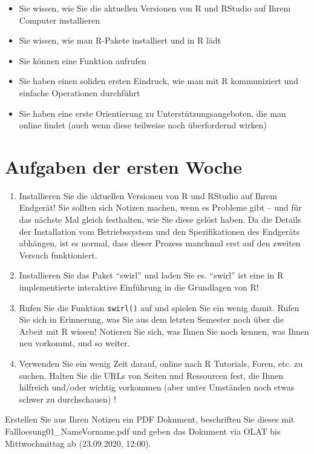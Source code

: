\documentclass[
]{book}
\providecommand{\tightlist}{%
  \setlength{\itemsep}{0pt}\setlength{\parskip}{0pt}}
\begin{document}
\begin{itemize}
\tightlist
\item
  Sie wissen, wie Sie die aktuellen Versionen von R und RStudio auf Ihrem Computer installieren
\item
  Sie wissen, wie man R-Pakete installiert und in R lädt
\item
  Sie können eine Funktion aufrufen
\item
  Sie haben einen soliden ersten Eindruck, wie man mit R kommuniziert und einfache Operationen durchführt
\item
  Sie haben eine erste Orientierung zu Unterstützungsangeboten, die man online findet (auch wenn diese teilweise noch überfordernd wirken)
\end{itemize}

\hypertarget{aufgaben-der-ersten-woche}{%
\section{Aufgaben der ersten Woche}\label{aufgaben-der-ersten-woche}}

\begin{enumerate}
\def\labelenumi{\arabic{enumi})}
\item
  Installieren Sie die aktuellen Versionen von R und RStudio auf Ihrem Endgerät! Sie sollten sich Notizen machen, wenn es Probleme gibt -- und für das nächste Mal gleich festhalten, wie Sie diese gelöst haben. Da die Details der Installation vom Betriebssystem und den Spezifikationen des Endgeräts abhängen, ist es normal, dass dieser Prozess manchmal erst auf den zweiten Versuch funktioniert.
\item
  Installieren Sie das Paket ``swirl'' und laden Sie es. ``swirl'' ist eine in R implementierte interaktive Einführung in die Grundlagen von R!
\item
  Rufen Sie die Funktion \texttt{swirl()} auf und spielen Sie ein wenig damit. Rufen Sie sich in Erinnerung, was Sie aus dem letzten Semester noch über die Arbeit mit R wissen! Notieren Sie sich, was Ihnen Sie noch kennen, was Ihnen neu vorkommt, und so weiter.
\item
  Verwenden Sie ein wenig Zeit darauf, online nach R Tutorials, Foren, etc. zu suchen. Halten Sie die URLs von Seiten und Ressourcen fest, die Ihnen hilfreich und/oder wichtig vorkommen (aber unter Umständen noch etwas schwer zu durchschauen) !
\end{enumerate}

Erstellen Sie aus Ihren Notizen ein PDF Dokument, beschriften Sie dieses mit Fallloesung01\_NameVorname.pdf und geben das Dokument via OLAT bis Mittwochmittag ab (23.09.2020, 12:00).

  
\end{document}
